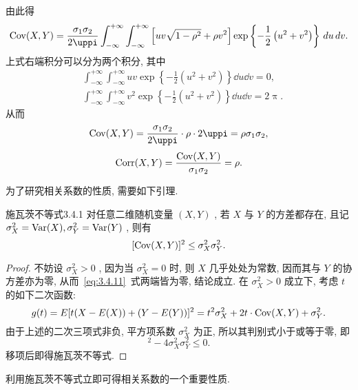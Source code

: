 \begin{example}
\begin{solution}
\begin{equation*}
			\end{equation*}
			由此得
			\begin{equation*}
				\Cov(X,Y)=\frac{\sigma_1\sigma_2}{2\uppi}\int_{-\infty}^{+\infty}\int_{-\infty}^{+\infty}\left[ uv\sqrt{1-\rho^2}+\rho v^2 \right]\exp\left\{ -\frac{1}{2}\left( u^2+v^2 \right) \right\}\dd u\dd v.
			\end{equation*}
			上式右端积分可以分为两个积分, 其中
			\begin{align*}
				&\int_{-\infty}^{+\infty}\int_{-\infty}^{+\infty} uv\exp\left\{ -\frac{1}{2}\left( u^2+v^2 \right) \right\}\dd u\dd v=0,\\
				&\int_{-\infty}^{+\infty}\int_{-\infty}^{+\infty} v^2\exp\left\{ -\frac{1}{2}\left( u^2+v^2 \right) \right\}\dd u\dd v=2\uppi.
			\end{align*}
			从而
			\begin{equation*}
				\Cov(X,Y)=\frac{\sigma_1\sigma_2}{2\uppi}\cdot \rho\cdot 2\uppi=\rho\sigma_1\sigma_2,
			\end{equation*}
			\begin{equation*}
				\operatorname{Corr}(X,Y)=\frac{\operatorname{Cov}(X,Y)}{\sigma_1\sigma_2}=\rho.
			\end{equation*}
		\end{solution}
	\end{example}
	为了研究相关系数的性质, 需要如下引理.
	\begin{lemma}{施瓦茨不等式}{3.4.1}
		对任意二维随机变量 $(X,Y)$ , 若 $X$ 与 $Y$ 的方差都存在, 且记 $\sigma_{X}^2=\operatorname{Var}(X),\sigma_{Y}^2=\operatorname{Var}(Y)$ , 则有
		\begin{equation}\label{eq:3.4.11}
			[\operatorname{Cov}(X,Y)]^2\le \sigma_{X}^2\sigma_{Y}^2.
		\end{equation}
		\begin{proof}
			不妨设 $\sigma_{X}^2>0$ , 因为当 $\sigma_{X}^2=0$ 时, 则 $X$ 几乎处处为常数, 因而其与 $Y$ 的协方差亦为零, 从而~\eqref{eq:3.4.11}~式两端皆为零, 结论成立. 在 $\sigma_{X}^2>0$ 成立下, 考虑 $t$ 的如下二次函数:
			\begin{equation*}
				g(t)=E[t(X-E(X))+(Y-E(Y))]^2=t^2 \sigma_{X}^2+2t\cdot \operatorname{Cov}(X,Y)+\sigma_{Y}^2.
			\end{equation*}
			由于上述的二次三项式非负, 平方项系数 $\sigma_{X}^2$ 为正, 所以其判别式小于或等于零, 即
			\begin{equation*}
				[2\Cov(X,Y)]^2-4\sigma_{X}^2\sigma_{Y}^2\leq0.
			\end{equation*}
			移项后即得施瓦茨不等式.
		\end{proof}
		利用施瓦茨不等式立即可得相关系数的一个重要性质.
	\end{lemma}
